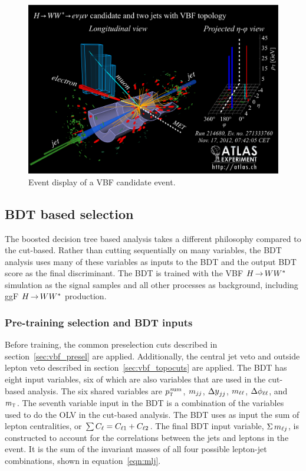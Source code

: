 \begin{figure}[h!]
  \centering
  \captionsetup{justification=centering}
  \includegraphics[width=\textwidth]{figures/eventdisplay}

  \caption{Event display of a VBF candidate event\cite{WW2015}.}
  \label{fig:eventdisplay}
\end{figure}                                                                                     


\subsection{BDT based selection}

The boosted decision tree based analysis takes a different philosophy compared to the cut-based. Rather than cutting sequentially on many variables, the BDT analysis uses many of these variables as inputs to the BDT and the output BDT score as the final discriminant. The BDT is trained with the VBF $H{\,{\rightarrow}\,}WW^\ast$ simulation as the signal samples and all other processes as background, including ggF $H{\,{\rightarrow}\,}WW^\ast$ production. 

\subsubsection{Pre-training selection and BDT inputs}
Before training, the common preselection cuts described in section~\ref{sec:vbf_presel} are applied. Additionally, the central jet veto and outside lepton veto described in section~\ref{sec:vbf_topocuts} are applied. The BDT has eight input variables, six of which are also variables that are used in the cut-based analysis. The six shared variables are $p_{\textrm{\footnotesize\sc t}}^{\,\rm sum}$, $m_{jj}$, $\dyjj$, $m_{\ell\ell}$, $\Delta\phi_{\ell\ell}$, and $m_{\textrm{\footnotesize\sc t}}$. The seventh variable input in the BDT is a combination of the variables used to do the OLV in the cut-based analysis. The BDT uses as input the sum of lepton centralities, or $\sum C_{\ell} = C_{\ell1} + C_{\ell2}$. The final BDT input variable, $\Sigma\,m_{\ell j}$, is constructed to account for the correlations between the jets and leptons in the event. It is the sum of the invariant masses of all four possible lepton-jet combinations, shown in equation~\ref{eqn:mlj}.

